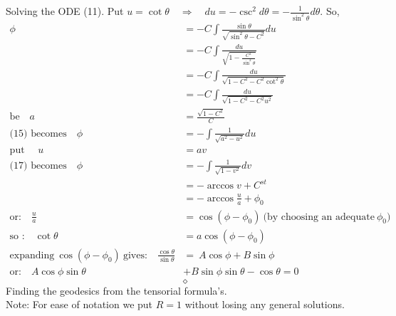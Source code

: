 Solving the ODE (11). Put $u = \cot \theta \quad \Rightarrow \quad du = - \csc^2 d\theta = -\frac{1}{\sin^2\theta} d\theta$. So,  
\begin{align}
\phi &= -C\int \frac{\sin \theta}{ \sqrt{\sin^2 \theta - C^2}}du\\
&= -C\int \frac{du}{ \sqrt{1- \frac{C^2 }{\sin^2 \theta}}}\\
&= -C\int \frac{du}{ \sqrt{1- C^2 - C^2 \cot^2 \theta}}\\
&= -C\int \frac{du}{ \sqrt{1- C^2 - C^2 u^2}}\\
\text{be}\quad a&= \frac{\sqrt{1-C^2}}{C}\\
\text{(15) becomes}\quad \phi &= -\int \frac{1}{ \sqrt{a^2 -  u^2}}du\\
\text{put }\quad u &= av\\
\text{(17) becomes}\quad \phi &= -\int \frac{1}{ \sqrt{1 -  v^2}}dv\\
\ &= -\arccos v + C^{st}\\
\ &= -\arccos \frac{u}{a}  + \phi_0\\
\text{or:}\quad \frac{u}{a} &= \cos (\phi - \phi_0)  \ \text{(by choosing an adequate}\ \phi_0\text{)}\\
\text{so :}\quad \cot\theta &= a \cos (\phi - \phi_0)  \\
\text{expanding} \  \cos (\phi - \phi_0)\  \text{gives:} \quad  \frac{\cos\theta}{\sin\theta} &= \ A\cos\phi + B\sin\phi\\
\text{or:} \quad  A\cos\phi \sin\theta &+ B\sin\phi\sin\theta -\cos\theta=0
\end{align}
$$\diamond$$
\newpage
Finding the geodesics from the tensorial formula's.\\
Note: For ease of notation we put $R=1$ without losing any general solutions.

